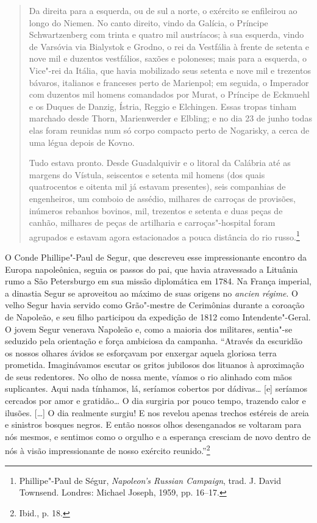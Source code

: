 \begin{quote}
Da direita para a esquerda, ou de sul a norte, o exército se enfileirou
ao longo do Niemen. No canto direito, vindo da Galícia, o Príncipe
Schwartzenberg com trinta e quatro mil austríacos; à sua esquerda, vindo
de Varsóvia via Bialystok e Grodno, o rei da Vestfália à frente de
setenta e nove mil e duzentos vestfálios, saxões e poloneses; mais para
a esquerda, o Vice"-rei da Itália, que havia mobilizado seus setenta e
nove mil e trezentos bávaros, italianos e franceses perto de Marienpol;
em seguida, o Imperador com duzentos mil homens comandados por Murat, o
Príncipe de Eckmuehl e os Duques de Danzig, Ístria, Reggio e Elchingen.
Essas tropas tinham marchado desde Thorn, Marienwerder e Elbling; e no
dia 23 de junho todas elas foram reunidas num só corpo compacto perto de
Nogarisky, a cerca de uma légua depois de Kovno.

Tudo estava pronto. Desde Guadalquivir e o litoral da Calábria até as
margens do Vístula, seiscentos e setenta mil homens (dos quais
quatrocentos e oitenta mil já estavam presentes), seis companhias de
engenheiros, um comboio de assédio, milhares de carroças de provisões,
inúmeros rebanhos bovinos, mil, trezentos e setenta e duas peças de
canhão, milhares de peças de artilharia e carroças"-hospital foram
agrupados e estavam agora estacionados a pouca distância do rio
russo.\footnote{Phillipe"-Paul de Ségur, \textit{Napoleon's Russian Campaign}, trad. J. David Townsend. Londres: Michael Joseph, 1959, pp. 16--17.} \end{quote}

O Conde Phillipe"-Paul de Segur, que descreveu esse impressionante
encontro da Europa napoleônica, seguia os passos do pai, que havia
atravessado a Lituânia rumo a São Petersburgo em sua missão diplomática
em 1784. Na França imperial, a dinastia Segur se aproveitou ao máximo de
suas origens no \textit{ancien régime}. O velho Segur havia servido como
Grão"-mestre de Cerimônias durante a coroação de Napoleão, e seu filho
participou da expedição de 1812 como Intendente"-Geral. O jovem Segur
venerava Napoleão e, como a maioria dos militares, sentia"-se seduzido
pela orientação e força ambiciosa da campanha. ``Através da escuridão os
nossos olhares ávidos se esforçavam por enxergar aquela gloriosa terra
prometida. Imaginávamos escutar os gritos jubilosos dos lituanos à
aproximação de seus redentores. No olho de nossa mente, víamos o rio
alinhado com mãos suplicantes. Aqui nada tínhamos, lá, seríamos cobertos
por dádivas\ldots{} {[}e{]} seríamos cercados por amor e gratidão\ldots{} O
dia surgiria por pouco tempo, trazendo calor e ilusões. [\ldots{}] O dia
realmente surgiu! E nos revelou apenas trechos estéreis de areia e
sinistros bosques negros. E então nossos olhos desenganados se voltaram
para nós mesmos, e sentimos como o orgulho e a esperança cresciam de
novo dentro de nós à visão impressionante de nosso exército
reunido.''\footnote{Ibid., p. 18.}

